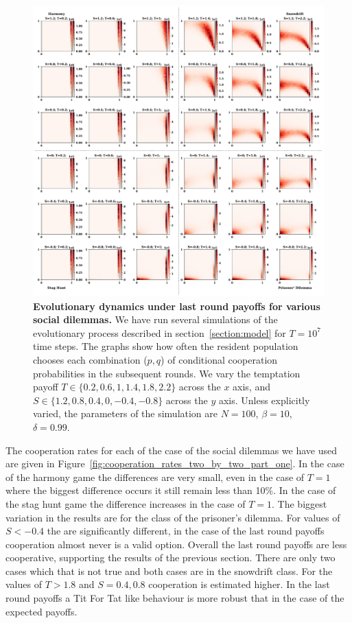 \documentclass[11pt]{article}
\theoremstyle{plainCl1}
\theoremstyle{plainCl2}
\begin{document}
\begin{figure}[!htbp]
  \centering
  \includegraphics[width=\textwidth]{static/stochastic_two_by_two_games.pdf}
  \caption{{\bf Evolutionary dynamics under last round payoffs for various social dilemmas.} 
  We have run several simulations of the evolutionary process described in
  section~\ref{section:model} for $T\!=\!10^7$ time steps. The graphs show how
  often the resident population chooses each combination ($p,q$) of conditional
  cooperation probabilities in the subsequent rounds. We vary the temptation
  payoff \(T \in \{0.2, 0.6, 1, 1.4, 1.8, 2.2\}\)
  across the \(x\) axis, and \(S \in \{1.2, 0.8, 0.4, 0, -0.4, -0.8\}\)
  across the \(y\) axis. Unless explicitly varied, the parameters of the simulation
  are $N\!=\!100$, $\beta\!=\!10$, $\delta\!=\!0.99$.}
  \label{fig:last_round_two_by_two}
\end{figure}

The cooperation rates for each of the case of the social dilemmas we have used
are given in Figure~\ref{fig:cooperation_rates_two_by_two_part_one}. In the case
of the harmony game the differences are very small, even in the case of \(T=1\)
where the biggest difference occurs it still remain less than 10\%. In the case
of the stag hunt game the difference increases in the case of \(T=1\). The
biggest variation in the results are for the class of the prisoner's dilemma.
For values of \(S < -0.4\) the are significantly different, in the case of the
last round payoffs cooperation almost never is a valid option. Overall the last
round payoffs are less cooperative, supporting the results of the previous
section. There are only two cases which that is not true and both cases are in
the snowdrift class. For the values of \(T>1.8\) and \(S=0.4, 0.8\) cooperation
is estimated higher. In the last round payoffs a Tit For Tat like behaviour is
more robust that in the case of the expected payoffs.
\end{document}
